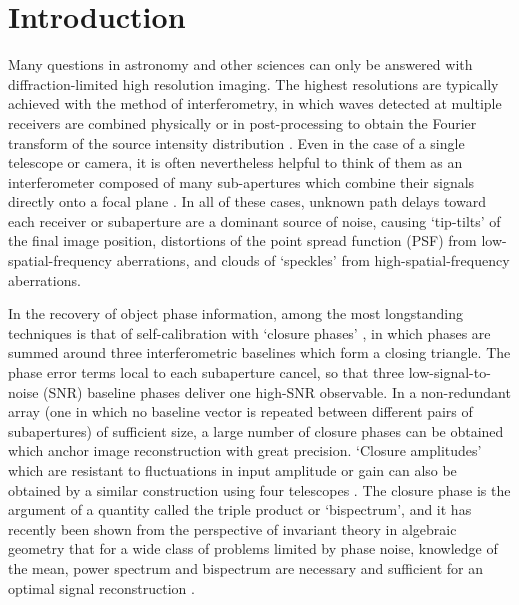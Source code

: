 \documentclass[modern]{aastex63}
\begin{document}
\section{Introduction} 
\label{sec:intro}
Many questions in astronomy and other sciences can only be answered with diffraction-limited high resolution imaging. The highest resolutions are typically achieved with the method of interferometry, in which waves detected at multiple receivers are combined physically or in post-processing to obtain the Fourier transform of the source intensity distribution \citep{vc34,zernike38}. Even in the case of a single telescope or camera, it is often nevertheless helpful to think of them as an interferometer composed of many sub-apertures which combine their signals directly onto a focal plane \citep[a `Fizeau interferometer':][]{fizeau1868}. In all of these cases, unknown path delays toward each receiver or subaperture are a dominant source of noise, causing `tip-tilts' of the final image position, distortions of the point spread function (PSF) from low-spatial-frequency aberrations, and clouds of `speckles' from high-spatial-frequency aberrations.

In the recovery of object phase information, among the most longstanding techniques is that of self-calibration with `closure phases' \citep[introduced in the context of radio astronomy by][]{jennison58}, in which phases are summed around three interferometric baselines which form a closing triangle. The phase error terms local to each subaperture cancel, so that three low-signal-to-noise (SNR) baseline phases deliver one high-SNR observable. In a non-redundant array (one in which no baseline vector is repeated between different pairs of subapertures) of sufficient size, a large number of closure phases can be obtained which anchor image reconstruction with great precision. `Closure amplitudes' which are resistant to fluctuations in input amplitude or gain can also be obtained by a similar construction using four telescopes \citep{twiss60,blackburn20}. The closure phase is the argument of a quantity called the triple product or `bispectrum', and it has recently been shown from the perspective of invariant theory in algebraic geometry that for a wide class of problems limited by phase noise, knowledge of the mean, power spectrum and bispectrum are necessary and sufficient for an optimal signal reconstruction \citep{bandeira17}.
\end{document}
